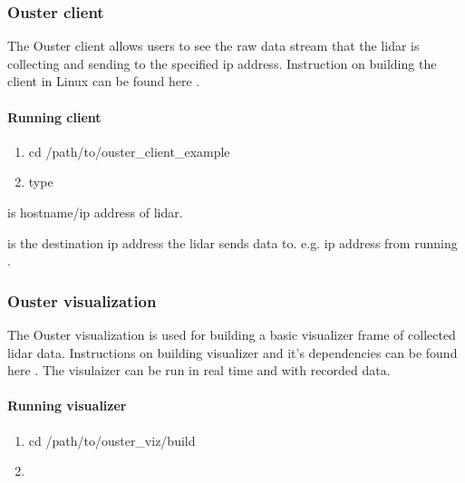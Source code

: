 \documentclass[letterpaper,10pt,english]{sphinxmanual}
\begin{document}
\subsubsection{Ouster client}
\label{\detokenize{Ouster lidar:ouster-client}}
The Ouster client allows users to see the raw data stream that the lidar is collecting and sending to the specified ip address.
Instruction on building the client in Linux can be found here .


\paragraph{Running client}
\label{\detokenize{Ouster lidar:running-client}}\begin{enumerate}
\def\theenumi{\arabic{enumi}}
\def\labelenumi{\theenumi .}
\makeatletter\def\p@enumii{\p@enumi \theenumi .}\makeatother
\item {} 
cd /path/to/ouster\_client\_example

\item {} 
type 

\end{enumerate}

 is hostname/ip address of lidar.

 is the destination ip address the lidar sends data to. e.g. ip address from running .


\subsubsection{Ouster visualization}
\label{\detokenize{Ouster lidar:ouster-visualization}}
The Ouster visualization is used for building a basic visualizer frame of collected lidar data. Instructions on building visualizer and it’s dependencies can be found here .
The visulaizer can be run in real time and with recorded data.


\paragraph{Running visualizer}
\label{\detokenize{Ouster lidar:running-visualizer}}\begin{enumerate}
\def\theenumi{\arabic{enumi}}
\def\labelenumi{\theenumi .}
\makeatletter\def\p@enumii{\p@enumi \theenumi .}\makeatother
\item {} 
cd /path/to/ouster\_viz/build

\item {} 

\end{enumerate}
\end{document}
